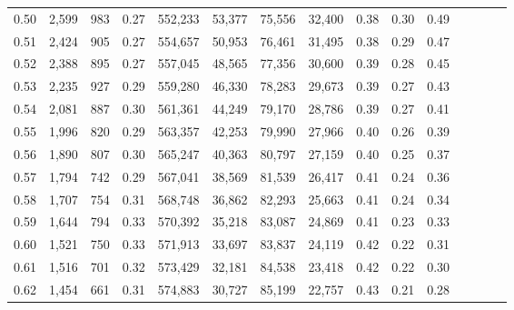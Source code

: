 \begin{tabular}{rrrcrrrrrrrrrrr}
0.50 &   2,599 &    983 &                                       0.27 &  552,233 &   53,377 &   75,556 &   32,400 &  0.38 &  0.30 &                         0.49 \\
0.51 &   2,424 &    905 &                                       0.27 &  554,657 &   50,953 &   76,461 &   31,495 &  0.38 &  0.29 &                         0.47 \\
0.52 &   2,388 &    895 &                                       0.27 &  557,045 &   48,565 &   77,356 &   30,600 &  0.39 &  0.28 &                         0.45 \\
0.53 &   2,235 &    927 &                                       0.29 &  559,280 &   46,330 &   78,283 &   29,673 &  0.39 &  0.27 &                         0.43 \\
0.54 &   2,081 &    887 &                                       0.30 &  561,361 &   44,249 &   79,170 &   28,786 &  0.39 &  0.27 &                         0.41 \\
0.55 &   1,996 &    820 &                                       0.29 &  563,357 &   42,253 &   79,990 &   27,966 &  0.40 &  0.26 &                         0.39 \\
0.56 &   1,890 &    807 &                                       0.30 &  565,247 &   40,363 &   80,797 &   27,159 &  0.40 &  0.25 &                         0.37 \\
0.57 &   1,794 &    742 &                                       0.29 &  567,041 &   38,569 &   81,539 &   26,417 &  0.41 &  0.24 &                         0.36 \\
0.58 &   1,707 &    754 &                                       0.31 &  568,748 &   36,862 &   82,293 &   25,663 &  0.41 &  0.24 &                         0.34 \\
0.59 &   1,644 &    794 &                                       0.33 &  570,392 &   35,218 &   83,087 &   24,869 &  0.41 &  0.23 &                         0.33 \\
0.60 &   1,521 &    750 &                                       0.33 &  571,913 &   33,697 &   83,837 &   24,119 &  0.42 &  0.22 &                         0.31 \\
0.61 &   1,516 &    701 &                                       0.32 &  573,429 &   32,181 &   84,538 &   23,418 &  0.42 &  0.22 &                         0.30 \\
0.62 &   1,454 &    661 &                                       0.31 &  574,883 &   30,727 &   85,199 &   22,757 &  0.43 &  0.21 &                         0.28 \\

\end{tabular}
